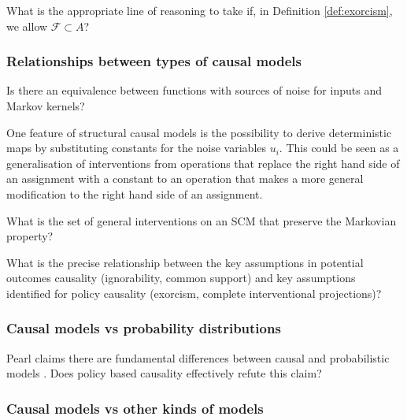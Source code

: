\begin{question}
    What is the appropriate line of reasoning to take if, in Definition \ref{def:exorcism}, we allow $\mathcal{F}\subset A$?
\end{question}

\subsubsection{Relationships between types of causal models}

\begin{question}
    Is there an equivalence between functions with sources of noise for inputs and Markov kernels?
\end{question}

\begin{question}
    One feature of structural causal models is the possibility to derive deterministic maps by substituting constants for the noise variables $u_i$. This could be seen as a generalisation of interventions from operations that replace the right hand side of an assignment with a constant to an operation that makes a more general modification to the right hand side of an assignment.
    
    What is the set of general interventions on an SCM that preserve the Markovian property?
\end{question}

\begin{question}
    What is the precise relationship between the key assumptions in potential outcomes causality (ignorability, common support) and key assumptions identified for policy causality (exorcism, complete interventional projections)?
\end{question}

\subsubsection{Causal models vs probability distributions}

\begin{question}
    Pearl claims there are fundamental differences between causal and probabilistic models \cite{pearl_causality:_2009}. Does policy based causality effectively refute this claim?
\end{question}


\subsubsection{Causal models vs other kinds of models}

